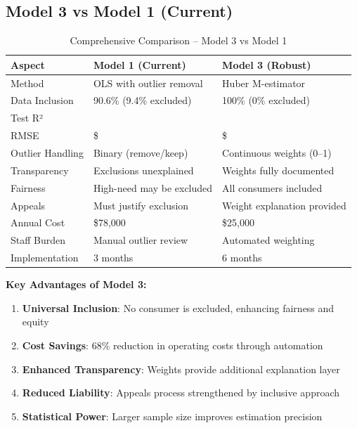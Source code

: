 \subsection{Model 3 vs Model 1 (Current)}

\begin{table}[h]
\centering
\caption{Comprehensive Comparison -- Model 3 vs Model 1}
\begin{tabular}{lll}
\toprule
\textbf{Aspect} & \textbf{Model 1 (Current)} & \textbf{Model 3 (Robust)} \\
\midrule
Method & OLS with outlier removal & Huber M-estimator \\
Data Inclusion & 90.6\% (9.4\% excluded) & 100\% (0\% excluded) \\
Test R² & \ModelOneRSquaredTest{} & \ModelThreeRSquaredTest{} \\
RMSE & \$\ModelOneRMSETest{} & \$\ModelThreeRMSETest{} \\
Outlier Handling & Binary (remove/keep) & Continuous weights (0--1) \\
Transparency & Exclusions unexplained & Weights fully documented \\
Fairness & High-need may be excluded & All consumers included \\
Appeals & Must justify exclusion & Weight explanation provided \\
Annual Cost & \$78,000 & \$25,000 \\
Staff Burden & Manual outlier review & Automated weighting \\
Implementation & 3 months & 6 months \\
\bottomrule
\end{tabular}
\end{table}

\textbf{Key Advantages of Model 3:}
\begin{enumerate}
    \item \textbf{Universal Inclusion}: No consumer is excluded, enhancing fairness and equity
    \item \textbf{Cost Savings}: 68\% reduction in operating costs through automation
    \item \textbf{Enhanced Transparency}: Weights provide additional explanation layer
    \item \textbf{Reduced Liability}: Appeals process strengthened by inclusive approach
    \item \textbf{Statistical Power}: Larger sample size improves estimation precision
\end{enumerate}

